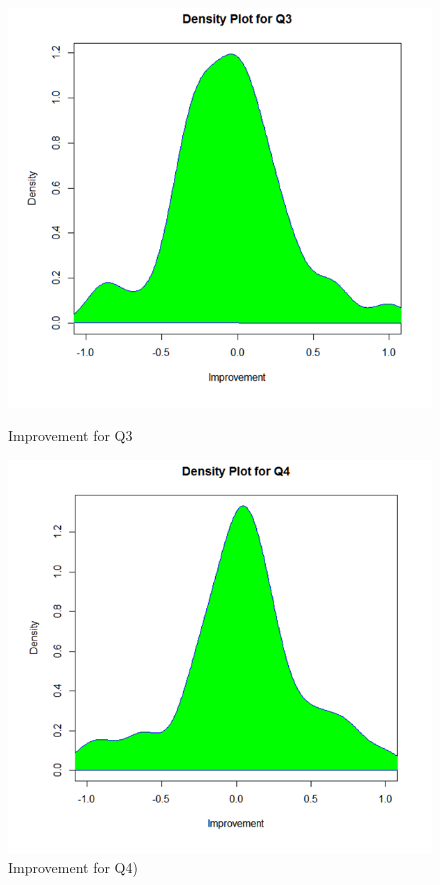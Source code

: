 \begin{figure}
	\centering
	\begin{minipage}{.5\textwidth}
		\centering
		\includegraphics[width=1\linewidth]{figures/Prepost_q3}
		\caption{Improvement for Q3}
		\label{fig:Prepost_q3}
	\end{minipage}%
	\begin{minipage}{.5\textwidth}
		\centering
		\includegraphics[width=1\linewidth]{figures/Prepost_q4}
		\caption{Improvement for Q4)}
		\label{fig:Prepost_q4}
	\end{minipage}
\end{figure}

